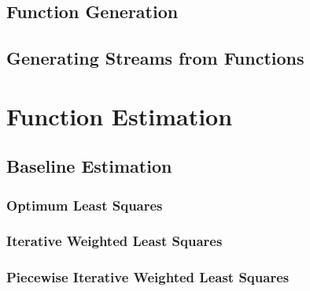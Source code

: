 \documentclass[a4paper,11pt]{article}
\begin{document}
\subsection{Function Generation}
\label{sec-3-1}
\subsection{Generating Streams from Functions}
\label{sec-3-2}
\section{Function Estimation}
\label{sec-4}
\subsection{Baseline Estimation}
\label{sec-4-1}
\subsubsection{Optimum Least Squares}
\label{sec-4-1-1}
\subsubsection{Iterative Weighted Least Squares}
\label{sec-4-1-2}
\subsubsection{Piecewise Iterative Weighted Least Squares}
\label{sec-4-1-3}
\end{document}
